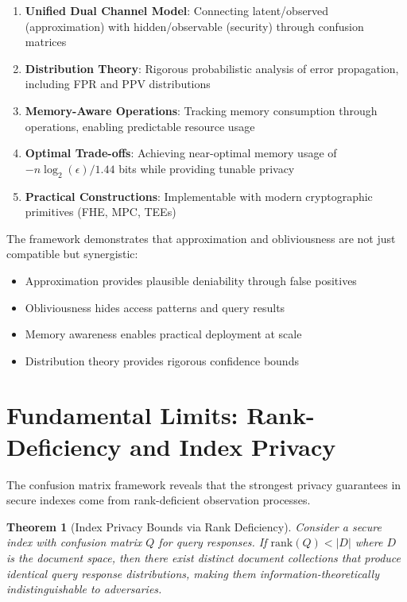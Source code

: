 \documentclass[11pt,final]{article}
\newtheorem{theorem}{Theorem}[section]
\begin{document}
\begin{enumerate}
    \item \textbf{Unified Dual Channel Model}: Connecting latent/observed (approximation) with hidden/observable (security) through confusion matrices
    
    \item \textbf{Distribution Theory}: Rigorous probabilistic analysis of error propagation, including FPR and PPV distributions
    
    \item \textbf{Memory-Aware Operations}: Tracking memory consumption through operations, enabling predictable resource usage
    
    \item \textbf{Optimal Trade-offs}: Achieving near-optimal memory usage of $-n\log_2(\epsilon)/1.44$ bits while providing tunable privacy
    
    \item \textbf{Practical Constructions}: Implementable with modern cryptographic primitives (FHE, MPC, TEEs)
\end{enumerate}

The framework demonstrates that approximation and obliviousness are not just compatible but synergistic:
\begin{itemize}
    \item Approximation provides plausible deniability through false positives
    \item Obliviousness hides access patterns and query results
    \item Memory awareness enables practical deployment at scale
    \item Distribution theory provides rigorous confidence bounds
\end{itemize}

\section{Fundamental Limits: Rank-Deficiency and Index Privacy}

The confusion matrix framework reveals that the strongest privacy guarantees in secure indexes come from rank-deficient observation processes.

\begin{theorem}[Index Privacy Bounds via Rank Deficiency]
Consider a secure index with confusion matrix $Q$ for query responses. If $\text{rank}(Q) < |D|$ where $D$ is the document space, then there exist distinct document collections that produce identical query response distributions, making them information-theoretically indistinguishable to adversaries.
\end{theorem}
\end{document}
